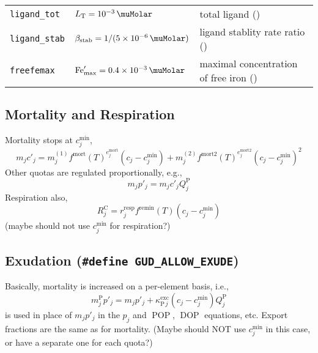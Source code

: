 \documentclass[11pt,letterpaper,english]{article}
\renewcommand{\ll}[1]{{\tt #1}}
\def\|#1|{\operatorname{#1}}
\def\tempMort{e^{\|mort|}_j}
\def\tempMortTWO{e^{\|mort2|}_j}
\DeclareMathOperator{\Fe}{Fe}
\DeclareMathOperator{\DOP}{DOP}
\DeclareMathOperator{\POP}{POP}
\newcommand{\C}{\mathrm{C}}
\renewcommand{\P}{\mathrm{P}}
\let\unit=\si
\renewcommand{\si}{\mathrm{si}}
\newcommand{\total}{{\mathrm{T}}}
\newcommand{\FeT}{\Fe_\total}
\newcommand{\Ltot}{L_\total}
\newcommand{\stab}{\text{stab}}
\newcommand{\Lstab}{\beta_{\stab}}
\newcommand{\resp}{{\text{resp}}}
\newcommand{\scav}{{\text{scav}}}
\newcommand{\remin}{{\text{remin}}}
\newcommand{\X}{c}
\begin{document}

%

\begin{tabular}{@{}l@{\qquad}l@{${}={}$}l}
\ll{ligand\_tot}  & $\Ltot=\SI{e-3}{\muMolar}$
                  & total ligand (\unit{\muMolar})  \\
\ll{ligand\_stab} & $\Lstab=1/(\SI{5E-6}{\muMolar})$
                  & ligand stablity rate ratio (\unit{\meter\cubed\per\milli\mol}) \\
\ll{freefemax}    & $\Fe'_{\max}=\SI{0.4E-3}{\muMolar}$
                  & maximal concentration of free iron (\unit{\milli\mol\per\meter\cubed})
\end{tabular}






\subsection{Mortality and Respiration}

Mortality stops at $\X_j^{\min}$,
\[
  m_j c'_j = m^{(1)}_j {f^{\|mort|}(T)}^{\tempMort} (\X_j - \X_j^{\min})
      + m^{(2)}_j {f^{\|mort2|}(T)}^{\tempMortTWO} (\X_j - \X_j^{\min})^2
\]
Other quotas are regulated proportionally, e.g.,
\[
  m_j p'_j = m_j c'_j Q^\P_j
\]
Respiration also,
\[
  R^\C_j = r^\resp_j f^\remin(T) (\X_j - \X_j^{\min})
\]
(maybe should not use $\X_j^{\min}$ for respiration?)



\subsection{Exudation ({\tt \#define GUD\_ALLOW\_EXUDE})}

Basically, mortality is increased on a per-element basis, i.e.,
\[
  m_j^{\P} p'_j = m_j p'_j + \kappa^{\|exc|}_{\P\,j} (\X_j - \X_j^{\min}) Q^\P_j
\]
is used in place of $m_j p'_j$ in the $p_j$ and $\POP$, $\DOP$ equations, etc.
Export fractions are the same as for mortality.
(Maybe should NOT use $\X_j^{\min}$ in this case, or have a separate one for each quota?)
\end{document}
